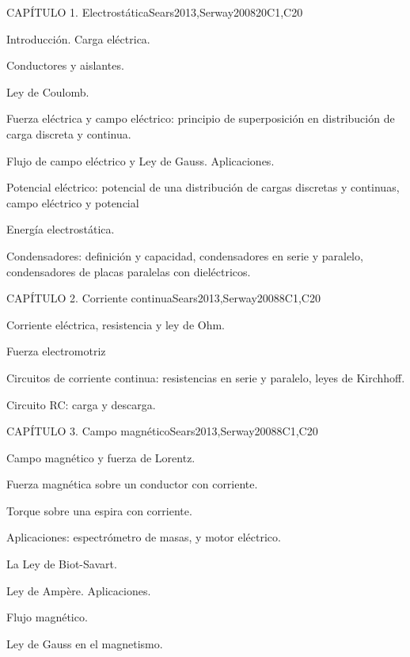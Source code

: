 \begin{syllabus}
\begin{unit}{CAPÍTULO 1. Electrostática}{}{Sears2013,Serway2008}{20}{C1,C20}
\begin{topics}
      \item Introducción. Carga eléctrica.
      \item Conductores y aislantes.
      \item Ley de Coulomb.
      \item Fuerza eléctrica y campo eléctrico: principio de superposición en distribución de carga discreta y continua.
      \item Flujo de campo eléctrico y Ley de Gauss. Aplicaciones.
      \item Potencial eléctrico: potencial de una distribución de cargas discretas y continuas, campo eléctrico y potencial
      \item Energía electrostática.
      \item Condensadores: definición y capacidad, condensadores en serie y paralelo, condensadores de placas paralelas con dieléctricos.
   \end{topics}

\end{unit}

\begin{unit}{CAPÍTULO 2. Corriente continua}{}{Sears2013,Serway2008}{8}{C1,C20}
\begin{topics}
      \item Corriente eléctrica, resistencia y ley de Ohm.
      \item Fuerza electromotriz
      \item Circuitos de corriente continua: resistencias en serie y paralelo, leyes de Kirchhoff. 
      \item Circuito RC: carga y descarga.
    \end{topics}

\end{unit}

\begin{unit}{CAPÍTULO 3. Campo magnético}{}{Sears2013,Serway2008}{8}{C1,C20}
\begin{topics}
      \item Campo magnético y fuerza de Lorentz.
      \item Fuerza magnética sobre un conductor con corriente.
      \item Torque sobre una espira con corriente.
      \item Aplicaciones: espectrómetro de masas, y motor eléctrico.
      \item La Ley de Biot-Savart. 
      \item Ley de Ampère. Aplicaciones.
      \item Flujo magnético.
      \item Ley de Gauss en el magnetismo.
\end{topics}


\end{unit}
\end{syllabus}
